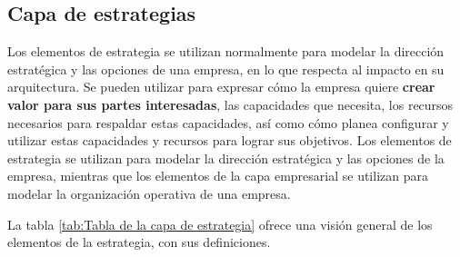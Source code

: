 
\subsection{Capa de estrategias}
Los elementos de estrategia se utilizan normalmente para modelar la dirección estratégica y las opciones de una empresa, en lo que respecta al impacto en su arquitectura. Se pueden utilizar para expresar cómo la empresa quiere \textbf{crear valor para sus partes interesadas}, las capacidades que necesita, los recursos necesarios para respaldar estas capacidades, así como cómo planea configurar y utilizar estas capacidades y recursos para lograr sus objetivos. Los elementos de estrategia se utilizan para modelar la dirección estratégica y las opciones de la empresa, mientras que los elementos de la capa empresarial se utilizan para modelar la organización operativa de una empresa.

La tabla \ref{tab:Tabla de la capa de estrategia} ofrece una visión general de los elementos de la estrategia, con sus definiciones.\cite{archimate} 

